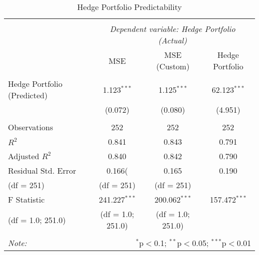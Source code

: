 \begin{table}[H] \centering
    \begin{tabular}{@{\extracolsep{5pt}}lccc}
    \\[-1.8ex]\hline
    \hline \\[-1.8ex]
    & \multicolumn{3}{c}{\textit{Dependent variable: Hedge Portfolio (Actual)}} \
    \cr \cline{3-4}
    \\[-1.8ex] & MSE & MSE (Custom) & Hedge Portfolio \\
    \hline \\[-1.8ex]
     Hedge Portfolio (Predicted) & 1.123$^{***}$ & 1.125$^{***}$ & 62.123$^{***}$ \\
      & (0.072) & (0.080) & (4.951) \\
    \hline \\[-1.8ex]
     Observations & 252 & 252 & 252 \\
     $R^2$ & 0.841 & 0.843 & 0.791 \\
     Adjusted $R^2$ & 0.840 & 0.842 & 0.790 \\
     Residual Std. Error & 0.166( & 0.165 & 0.190 \\
     (df = 251) & (df = 251)& (df = 251)& \\
     F Statistic & 241.227$^{***}$  & 200.062$^{***}$  & 157.472$^{***}$  \\
      (df = 1.0; 251.0) & (df = 1.0; 251.0)& (df = 1.0; 251.0)&\\
    \hline
    \hline \\[-1.8ex]
    \textit{Note:} & \multicolumn{3}{r}{$^{*}$p$<$0.1; $^{**}$p$<$0.05; $^{***}$p$<$0.01} \\
    \end{tabular}
    \caption{Hedge Portfolio Predictability}
    \label{hp-predicability-actual-returns}
    \end{table}
